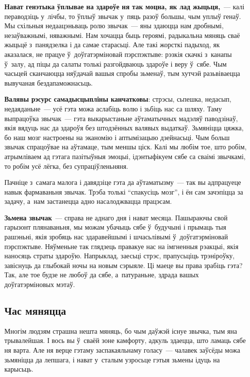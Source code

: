 \textbf{Нават генэтыка ўплывае на здароўе ня так моцна, як лад жыцьця,}~--- калі пераводзіць у~лічбы, то ўплыў звычак у~пяць разоў большы, чым уплыў генаў. Мы схільныя недаацэньваць ролю звычак~--- яны здаюцца нам дробнымі, незаўважнымі, няважнымі. Нам хочацца быць героямі, радыкальна мяняць сваё жыцьцё з~панядзелка і да самае старасьці. Але такі жорсткі падыход, як аказалася, не працуе ў~доўгатэрміновай пэрспэктыве: рэзкія скачкі з~канапы ў~залу, ад піцы да салаты толькі разгойдваюць здароўе і веру ў~сябе. Чым часьцей сканчаюцца няўдачай вашыя спробы зьменаў, тым хутчэй разьвіваецца вывучаная бездапаможнасьць.

\textbf{Валявы рэсурс самадысцыпліны канчатковы}: стрэсы, сьпешка, недасып, недаяданьне~--- усё гэта можа аслабіць волю і зьбіць нас са шляху. Таму выпрацоўка звычак~--- гэта выкарыстаньне аўтаматычных мадэляў паводзінаў, якія вядуць нас да здароўя без штодзённых валявых выдаткаў. Зьмяніцца цяжка, бо наш мозг настроены на эканомію і аптымізацыю дзейнасьці. Чым больш звычак спрацоўвае на аўтамаце, тым меншы ціск. Калі мы любім тое, што робім, атрымліваем ад гэтага пазітыўныя эмоцыі, ідэнтыфікуем сябе са сваімі звычкамі, то робім усё лёгка, без супраціўленьняня.


Пачніце з~самага малога і давядзіце гэта да аўтаматызму~--- так вы адпрацуеце навык фармаваньня звычак. Трэба толькі ``спакусіць мозг'', і ён сам зачэпіцца за задачу, а~нам застанецца адно насалоджвацца працэсам.

\textbf{Зьмена звычак}~--- справа не аднаго дня і нават месяца. Пашыраючы свой гарызонт плянаваньня, мы можам убачыць сябе ў~будучыні і прымаць тыя рашэньні, якія зробяць нас здаравейшымі і шчасьлівымі ў~доўгатэрміновай пэрспэктыве. Няўменьне так глядзець правакуе нас на імгненныя рэакцыі, якія наносяць страты здароўю. Напрыклад, заесьці стрэс, прапусьціць трэніроўку, завіснуць да глыбокай ночы на новым сэрыяле. Ці маеце вы права зрабіць гэта? Так, але тое будзе не любоў да сябе, а~патураньне, здрада вашых доўгатэрміновых мэтаў.

\subsection*{Час мяняцца}

Многім людзям страшна нешта мяняць, бо чым даўжэй існуе звычка, тым яна трывалейшая. І вось вы ў~сваёй зоне камфорту, адкуль здаецца, што ламаць сябе ня варта. Але ня верце гэтаму заспакаяльнаму голасу~--- чалавек заўсёды можа зьмяніцца да лепшага, і нават у~сталым узросьце гэтыя зьмены ідуць на карысьць.

